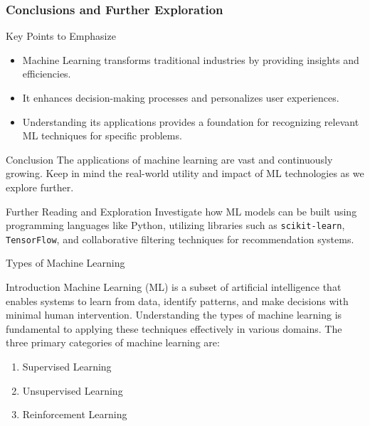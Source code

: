 \documentclass[aspectratio=169]{beamer}
\begin{document}
\begin{frame}[fragile]
  \frametitle{Conclusions and Further Exploration}
  \begin{block}{Key Points to Emphasize}
    \begin{itemize}
      \item Machine Learning transforms traditional industries by providing insights and efficiencies.
      \item It enhances decision-making processes and personalizes user experiences.
      \item Understanding its applications provides a foundation for recognizing relevant ML techniques for specific problems.
    \end{itemize}
  \end{block}

  \begin{block}{Conclusion}
    The applications of machine learning are vast and continuously growing. Keep in mind the real-world utility and impact of ML technologies as we explore further.
  \end{block}

  \begin{block}{Further Reading and Exploration}
    Investigate how ML models can be built using programming languages like Python, utilizing libraries such as \texttt{scikit-learn}, \texttt{TensorFlow}, and collaborative filtering techniques for recommendation systems.
  \end{block}
\end{frame}

\begin{frame}{Types of Machine Learning}
    \begin{block}{Introduction}
        Machine Learning (ML) is a subset of artificial intelligence that enables systems to learn from data, identify patterns, and make decisions with minimal human intervention.
        Understanding the types of machine learning is fundamental to applying these techniques effectively in various domains. The three primary categories of machine learning are:
    \end{block}
    \begin{enumerate}
        \item Supervised Learning
        \item Unsupervised Learning
        \item Reinforcement Learning
    \end{enumerate}
\end{frame}
\end{document}
